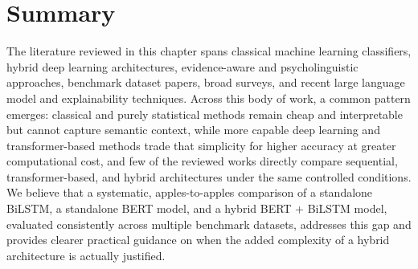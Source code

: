 \section{Summary}

The literature reviewed in this chapter spans classical machine learning classifiers, hybrid deep learning architectures, evidence-aware and psycholinguistic approaches, benchmark dataset papers, broad surveys, and recent large language model and explainability techniques. Across this body of work, a common pattern emerges: classical and purely statistical methods remain cheap and interpretable but cannot capture semantic context, while more capable deep learning and transformer-based methods trade that simplicity for higher accuracy at greater computational cost, and few of the reviewed works directly compare sequential, transformer-based, and hybrid architectures under the same controlled conditions. We believe that a systematic, apples-to-apples comparison of a standalone BiLSTM, a standalone BERT model, and a hybrid BERT + BiLSTM model, evaluated consistently across multiple benchmark datasets, addresses this gap and provides clearer practical guidance on when the added complexity of a hybrid architecture is actually justified.
